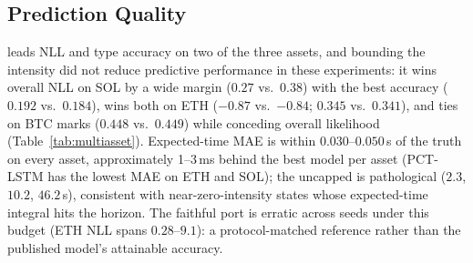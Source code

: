 \begin{table}[t]
\centering\footnotesize
\setlength{\tabcolsep}{2.3pt}
\resizebox{\textwidth}{!}{}
\caption{Prediction per genuine test event (mean $\pm$ 95\% CI over three
training seeds; streaming lossless evaluator). NLL = overall negative
log-likelihood (time $+$ mark); ACC = next-type accuracy at the observed
event time; MAE = expected-time mean absolute error in seconds (60\,s
evaluation horizon). \ssppp{} wins NLL and ACC on ETH and SOL and
ties \nhp{} on BTC accuracy; \spppu's MAE column reflects expected times
that run into the evaluator's horizon clamp on a subset of states.}
\label{tab:multiasset}
\end{table}

\subsection{Prediction Quality}
\label{sec:prediction}
\ssppp{} leads NLL and type accuracy on two of the three assets, and
bounding the intensity did not reduce predictive performance in these
experiments: it wins overall NLL on SOL by a wide margin ($0.27$ vs.\
$0.38$) with the best accuracy ($0.192$ vs.\ $0.184$), wins both on ETH
($-0.87$ vs.\ $-0.84$; $0.345$ vs.\ $0.341$), and ties \nhp{} on BTC marks
($0.448$ vs.\ $0.449$) while conceding overall likelihood
(Table~\ref{tab:multiasset}).
Expected-time MAE is within $0.030$--$0.050$\,s of the truth on every
asset, approximately 1--3\,ms behind the best model per asset (PCT-LSTM has
the lowest MAE on ETH and SOL); the uncapped \spppu{} is pathological
($2.3$, $10.2$, $46.2$\,s), consistent with near-zero-intensity states
whose expected-time integral hits the horizon. The faithful
\spppub{} port is erratic across seeds under this budget (ETH NLL spans
$0.28$--$9.1$): a protocol-matched reference rather than the published model's
attainable accuracy.

